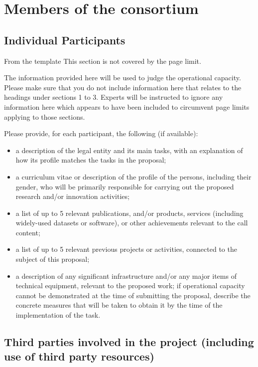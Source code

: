 \chapter{Members of the consortium}

\section{Individual Participants}\label{sec:partners}

\begin{todo}{From the template}
This section is not covered by the page limit.

The information provided here will be used to judge the operational capacity. Please make sure that you do not include information here that relates to the headings under sections 1 to 3. Experts will be instructed to ignore any information here which appears to have been included to circumvent page limits applying to those sections.

Please provide, for each participant, the following (if available):
\begin{itemize}
\item a description of the legal entity and its main tasks, with an explanation of how its profile matches the tasks in the proposal;
\item a curriculum vitae or description of the profile of the persons, including their gender, who will be primarily responsible for carrying out the proposed research and/or innovation activities;
\item a list of up to 5 relevant publications, and/or products, services (including widely-used datasets or software), or other achievements relevant to the  call content;
\item a list of up to 5 relevant previous projects or activities, connected to the subject of this proposal;
\item a description of any significant infrastructure and/or any major items of technical equipment, relevant to the proposed work;
if operational capacity cannot be demonstrated at the time of submitting the proposal, describe the concrete measures that will be taken to obtain it by the time of the implementation of the task.
\end{itemize}
\end{todo}


































\section{Third parties involved in the project (including use of third party resources)}

